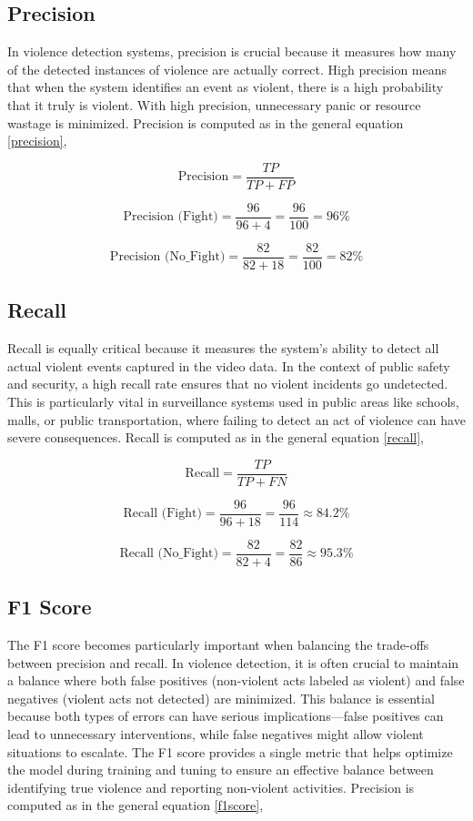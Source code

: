 \subsection{Precision}
In violence detection systems, precision is crucial because it measures how many of the detected instances of violence are actually correct. High precision means that when the system identifies an event as violent, there is a high probability that it truly is violent. With high precision, unnecessary panic or resource wastage is minimized. Precision is computed as in the general equation \ref{precision},

\begin{equation}
\text{Precision} = \frac{TP}{TP + FP}
\label{precision}
\end{equation}

\[
\text{Precision (Fight)} = \frac{96}{96 + 4} = \frac{96}{100} = 96\%
\]

\[
\text{Precision (No\_Fight)} = \frac{82}{82 + 18} = \frac{82}{100} = 82\%
\]

\subsection{Recall}
Recall is equally critical because it measures the system’s ability to detect all actual violent events captured in the video data. In the context of public safety and security, a high recall rate ensures that no violent incidents go undetected. This is particularly vital in surveillance systems used in public areas like schools, malls, or public transportation, where failing to detect an act of violence can have severe consequences. Recall is computed as in the general equation \ref{recall},

\begin{equation}
\text{Recall} = \frac{TP}{TP + FN}
\label{recall}
\end{equation}

\[
\text{Recall (Fight)} = \frac{96}{96 + 18} = \frac{96}{114} \approx 84.2\%
\]

\[
\text{Recall (No\_Fight)} = \frac{82}{82 + 4} = \frac{82}{86} \approx 95.3\%
\]

\subsection{F1 Score}

The F1 score becomes particularly important when balancing the trade-offs between precision and recall. In violence detection, it is often crucial to maintain a balance where both false positives (non-violent acts labeled as violent) and false negatives (violent acts not detected) are minimized. This balance is essential because both types of errors can have serious implications—false positives can lead to unnecessary interventions, while false negatives might allow violent situations to escalate. The F1 score provides a single metric that helps optimize the model during training and tuning to ensure an effective balance between identifying true violence and reporting non-violent activities. Precision is computed as in the general equation \ref{f1score},

